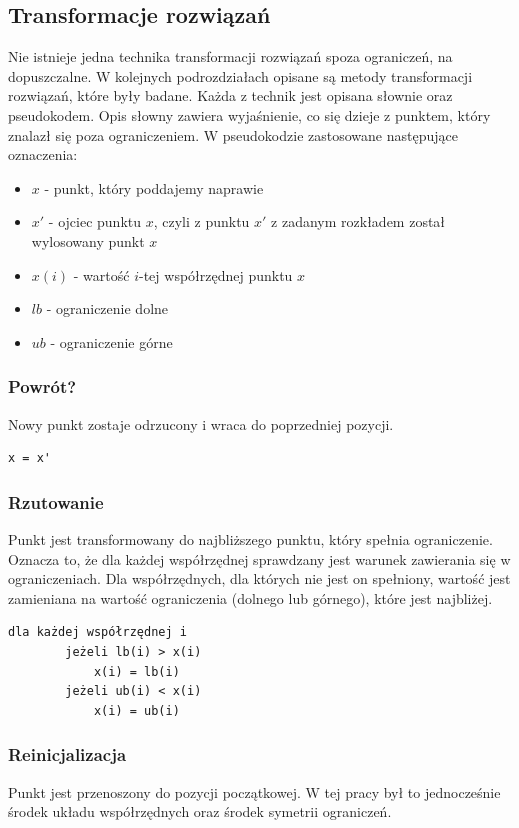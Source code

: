 \documentclass{mini}
\begin{document}
\subsection{Transformacje rozwiązań} \label{transformacje}
Nie istnieje jedna technika transformacji rozwiązań spoza ograniczeń, na dopuszczalne. W kolejnych podrozdziałach opisane są metody transformacji rozwiązań, które były badane. Każda z technik jest opisana słownie oraz pseudokodem. Opis słowny zawiera wyjaśnienie, co się dzieje z punktem, który znalazł się poza ograniczeniem. W pseudokodzie zastosowane następujące oznaczenia:
\begin{itemize}[noitemsep]
\item $x$ - punkt, który poddajemy naprawie
\item $x'$ - ojciec punktu $x$, czyli z punktu $x'$ z zadanym rozkładem został wylosowany punkt $x$
\item $x(i)$ - wartość $i$-tej współrzędnej punktu $x$
\item $lb$ - ograniczenie dolne
\item $ub$ - ograniczenie górne
\end{itemize}

\subsubsection{Powrót?}
Nowy punkt zostaje odrzucony i wraca do poprzedniej pozycji.

\begin{Verbatim}[baselinestretch=1.1]
	x = x'
\end{Verbatim}


\subsubsection{Rzutowanie}
Punkt jest transformowany do najbliższego punktu, który spełnia ograniczenie. Oznacza to, że dla każdej współrzędnej sprawdzany jest warunek zawierania się w ograniczeniach. Dla współrzędnych, dla których nie jest on spełniony, wartość jest zamieniana na wartość ograniczenia (dolnego lub górnego), które jest najbliżej.

\begin{Verbatim}[baselinestretch=1.1]
	dla każdej współrzędnej i
		jeżeli lb(i) > x(i)
			x(i) = lb(i)
		jeżeli ub(i) < x(i)
			x(i) = ub(i)
\end{Verbatim}

\subsubsection{Reinicjalizacja}
Punkt jest przenoszony do pozycji początkowej. W tej pracy był to jednocześnie środek układu współrzędnych oraz środek symetrii ograniczeń.
\end{document}
